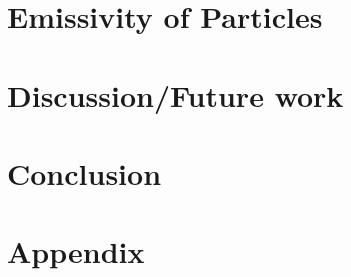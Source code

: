 \documentclass[a4paper, 12pt, openany]{book}
\begin{document}
\chapter{Emissivity of Particles}

\newpage
\chapter{Discussion/Future work}

\newpage
\chapter{Conclusion}

\newpage
\printbibliography
\newpage
\chapter*{Appendix}

\newpage
\end{document}
